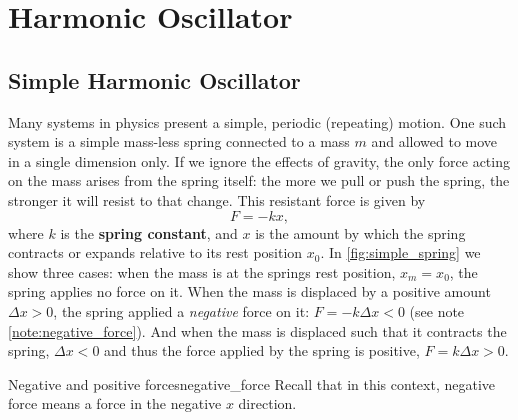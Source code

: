 \section{Harmonic Oscillator}
\subsection{Simple Harmonic Oscillator}
Many systems in physics present a simple, periodic (repeating) motion. One such system is a simple mass-less spring connected to a mass $m$ and allowed to move in a single dimension only. If we ignore the effects of gravity, the only force acting on the mass arises from the spring itself: the more we pull or push the spring, the stronger it will resist to that change. This resistant force is given by
\begin{equation}
  F = -kx,
  \label{eq:spring_force}
\end{equation}
where $k$ is the \textbf{spring constant}, and $x$ is the amount by which the spring contracts or expands relative to its rest position $x_{0}$. In \autoref{fig:simple_spring} we show three cases: when the mass is at the springs rest position, $x_{m}=x_{0}$, the spring applies no force on it. When the mass is displaced by a positive amount $\Delta x>0$, the spring applied a \textit{negative} force on it: $F=-k\Delta x<0$ (see note \autoref{note:negative_force}). And when the mass is displaced such that it contracts the spring, $\Delta x<0$ and thus the force applied by the spring is positive, $F=k\Delta x>0$.

\begin{note}{Negative and positive forces}{negative_force}
  Recall that in this context, negative force means a force in the negative $x$ direction.
\end{note}

